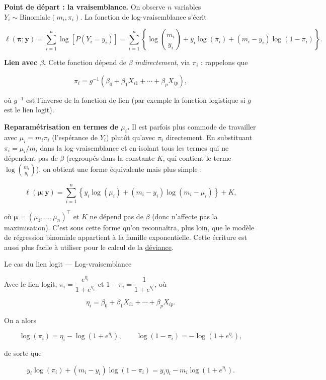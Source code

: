 \documentclass[
  french,
  letterpaper,
  DIV=11,
  numbers=noendperiod]{scrreprt}
\begin{document}
\textbf{Point de départ : la vraisemblance.} On observe \(n\) variables
\(Y_i \sim \text{Binomiale}(m_i, \pi_i)\). La fonction de
log-vraisemblance s'écrit

\[
\ell(\boldsymbol{\pi}; \boldsymbol{y}) = \sum_{i=1}^n \log\left[P(Y_i = y_i)\right]
= \sum_{i=1}^n \left\{ \log\binom{m_i}{y_i} + y_i \log(\pi_i) + (m_i - y_i)\log(1-\pi_i) \right\}.
\]

\textbf{Lien avec \(\beta\).} Cette fonction dépend de \(\beta\)
\emph{indirectement}, via \(\pi_i\) : rappelons que

\[
\pi_i = g^{-1}(\beta_0 + \beta_1 X_{i1} + \cdots + \beta_p X_{ip}),
\]

où \(g^{-1}\) est l'inverse de la fonction de lien (par exemple la
fonction logistique si \(g\) est le lien logit).

\textbf{Reparamétrisation en termes de \(\mu_i\).} Il est parfois plus
commode de travailler avec \(\mu_i = m_i \pi_i\) (l'espérance de
\(Y_i\)) plutôt qu'avec \(\pi_i\) directement. En substituant
\(\pi_i = \mu_i/m_i\) dans la log-vraisemblance et en isolant tous les
termes qui ne dépendent pas de \(\beta\) (regroupés dans la constante
\(K\), qui contient le terme \(\log\binom{m_i}{y_i}\)), on obtient une
forme équivalente mais plus simple :

\[
\ell(\boldsymbol{\mu}; \boldsymbol{y}) = \sum_{i=1}^n \left\{ y_i \log(\mu_i) + (m_i - y_i)\log(m_i - \mu_i) \right\} + K,
\]

où \(\boldsymbol{\mu} = (\mu_1, \dots, \mu_n)^\top\) et \(K\) ne dépend
pas de \(\beta\) (donc n'affecte pas la maximisation). C'est sous cette
forme qu'on reconnaîtra, plus loin, que le modèle de régression
binomiale appartient à la famille exponentielle. Cette écriture est
aussi plus facile à utiliser pour le calcul de la
\hyperref[sec-deviance]{déviance}.

{Le cas du lien logit --- Log-vraisemblance}

Avec le lien logit, \(\pi_i = \dfrac{e^{\eta_i}}{1+e^{\eta_i}}\) et
\(1-\pi_i = \dfrac{1}{1+e^{\eta_i}}\), où

\[
\eta_i = \beta_0 + \beta_1 X_{i1} + \cdots + \beta_p X_{ip}.
\]

On a alors

\[
\log(\pi_i) = \eta_i - \log(1+e^{\eta_i}), \qquad \log(1-\pi_i) = -\log(1+e^{\eta_i}),
\]

de sorte que

\[
y_i \log(\pi_i) + (m_i - y_i)\log(1-\pi_i) = y_i \eta_i - m_i \log(1+e^{\eta_i}).
\]
\end{document}
